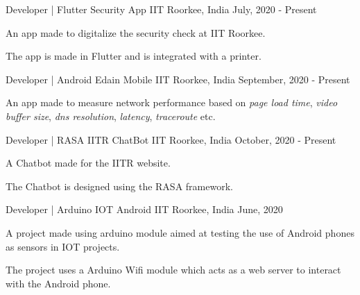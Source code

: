 

\begin{cventries}

  \cventry
    {Developer | Flutter} %
    {Security App} %
    {IIT Roorkee, India} %
    {July, 2020 - Present} %
    {
      \begin{cvitems} %
        \item {An app made to digitalize the security check at IIT Roorkee.}
        \item {The app is made in Flutter and is integrated with a printer.}
      \end{cvitems}
    }

  \cventry
    {Developer | Android} %
    {Edain Mobile} %
    {IIT Roorkee, India} %
    {September, 2020 - Present} %
    {
      \begin{cvitems} %
        \item {An app made to measure network performance based on \textit{page load time}, \textit{video buffer size},
        \textit{dns resolution}, \textit{latency}, \textit{traceroute} etc.}
      \end{cvitems}
    }

  \cventry
    {Developer | RASA} %
    {IITR ChatBot} %
    {IIT Roorkee, India} %
    {October, 2020 - Present} %
    {
      \begin{cvitems} %
        \item {A Chatbot made for the IITR website.}
        \item {The Chatbot is designed using the RASA framework.}
      \end{cvitems}
    }

  \cventry
    {Developer | Arduino} %
    {IOT Android} %
    {IIT Roorkee, India} %
    {June, 2020} %
    {
      \begin{cvitems} %
        \item {A project made using arduino module aimed at testing the use of Android phones as sensors in IOT projects.}
        \item {The project uses a Arduino Wifi module which acts as a web server to interact with the Android phone.}
      \end{cvitems}
    }

\end{cventries}